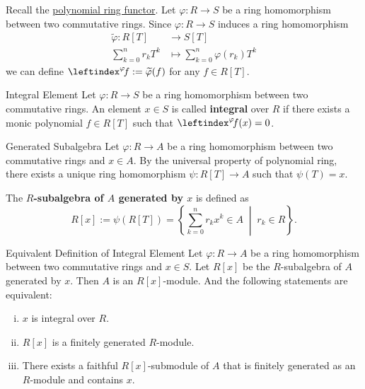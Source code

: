 Recall the \hyperref[th:free_commutative_algebra]{polynomial ring functor}. Let $\varphi:R\to S$ be a ring homomorphism between two commutative rings. Since $\varphi:R\to S$ induces a ring homomorphism 
\begin{align*}
    \widetilde{\varphi}:R[T]& \longrightarrow S[T]\\
    \sum_{k=0}^n r_k T^k &\longmapsto \sum_{k=0}^n \varphi(r_k) T^k
\end{align*}
we can define $\leftindex^{\varphi}\!f:=\widetilde{\varphi}(f)$ for any $f\in R[T]$.

\begin{definition}{Integral Element}{}
    Let $\varphi:R\to S$ be a ring homomorphism between two commutative rings. An element $x\in S$ is called \textbf{integral} over $R$ if there exists a monic polynomial $f\in R[T]$ such that $\leftindex^{\varphi}\!f(x)=0$.
\end{definition}



\begin{definition}{Generated Subalgebra}{}
    Let $\varphi:R\to A$ be a ring homomorphism between two commutative rings and $x\in A$. By the universal property of polynomial ring, there exists a unique ring homomorphism $\psi:R[T]\to A$ such that 
    $\psi(T)=x$.
    \begin{center}
    \end{center}
    The \textbf{$R$-subalgebra of $A$ generated by $x$} is defined as 
    \[
    R[x]:=\psi\left(R[T]\right)=\left\{\sum_{k=0}^n r_k x^k \in A\;\middle|\; r_k\in R\right\}.
    \]
\end{definition}

\begin{proposition}{Equivalent Definition of Integral Element}{}
    Let $\varphi:R\to A$ be a ring homomorphism between two commutative rings and $x\in S$. Let $R[x]$ be the $R$-subalgebra of $A$ generated by $x$. Then $A$ is an $R[x]$-module. And the following statements are equivalent:
    \begin{enumerate}[(i)]
        \item $x$ is integral over $R$.
        \item $R[x]$ is a finitely generated $R$-module.
        \item There exists a faithful $R[x]$-submodule of $A$ that is finitely generated as an $R$-module and contains $x$.
    \end{enumerate}
    
\end{proposition}

